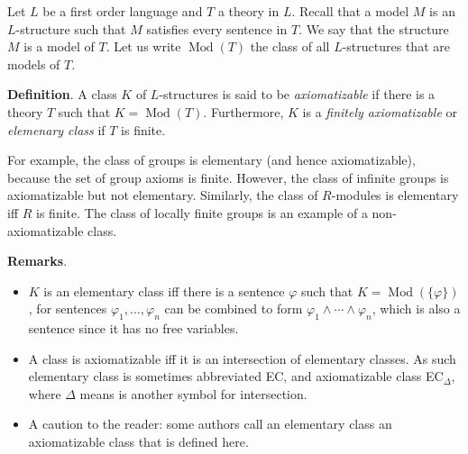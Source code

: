 \documentclass[12pt]{article}
\begin{document}
Let $L$ be a first order language and $T$ a theory in $L$.  Recall that a model $M$ is an $L$-structure such that $M$ satisfies every sentence in $T$.  We say that the structure $M$ is a model of $T$.  Let us write $\operatorname{Mod}(T)$ the class of all $L$-structures that are models of $T$.

\textbf{Definition}.  A class $K$ of $L$-structures is said to be \emph{axiomatizable} if there is a theory $T$ such that $K=\operatorname{Mod}(T)$.  Furthermore, $K$ is a \emph{finitely axiomatizable} or \emph{elemenary class} if $T$ is finite.

For example, the class of groups is elementary (and hence axiomatizable), because the set of group axioms is finite.  However, the class of infinite groups is axiomatizable but not elementary.  Similarly, the class of $R$-modules is elementary iff $R$ is finite.  The class of locally finite groups is an example of a non-axiomatizable class.

\textbf{Remarks}. 
\begin{itemize}
\item 
$K$ is an elementary class iff there is a sentence $\varphi$ such that $K=\operatorname{Mod}(\lbrace \varphi \rbrace)$, for sentences $\varphi_1,\ldots,\varphi_n$ can be combined to form $\varphi_1\wedge \cdots \wedge \varphi_n$, which is also a sentence since it has no free variables.
\item
A class is axiomatizable iff it is an intersection of elementary classes.  As such elementary class is sometimes abbreviated EC, and axiomatizable class EC$_{\Delta}$, where $\Delta$ means is another symbol for intersection.
\item
A caution to the reader: some authors call an elementary class an axiomatizable class that is defined here.
\end{itemize}
\end{document}
